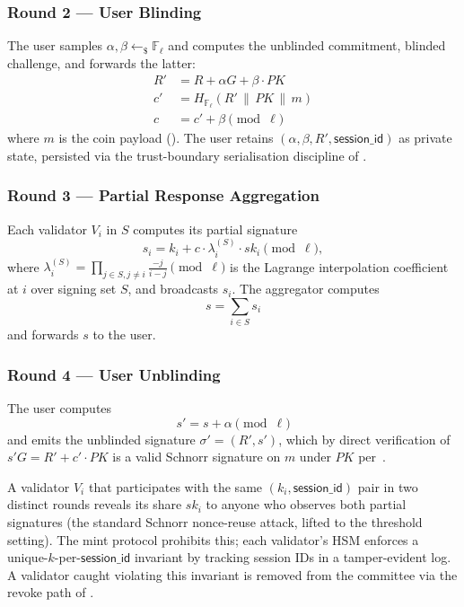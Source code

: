 \subsubsection{Round 2 --- User Blinding}
\label{sec:mint-sign-r2}

The user samples $\alpha, \beta \leftarrow_\$ \mathbb{F}_\ell$ and computes the unblinded commitment, blinded challenge, and forwards the latter:
\begin{align*}
  R' &= R + \alpha G + \beta \cdot PK \\
  c' &= H_{\mathbb{F}_\ell}(R' \,\|\, PK \,\|\, m) \\
  c &= c' + \beta \pmod{\ell}
\end{align*}
where $m$ is the coin payload (). The user retains $(\alpha, \beta, R', \mathsf{session\_id})$ as private state, persisted via the trust-boundary serialisation discipline of .

\subsubsection{Round 3 --- Partial Response Aggregation}
\label{sec:mint-sign-r3}

Each validator $V_i$ in $S$ computes its partial signature
\[
  s_i = k_i + c \cdot \lambda_i^{(S)} \cdot sk_i \pmod{\ell},
\]
where $\lambda_i^{(S)} = \prod_{j \in S, j \neq i} \frac{-j}{i - j} \pmod{\ell}$ is the Lagrange interpolation coefficient at $i$ over signing set $S$, and broadcasts $s_i$. The aggregator computes
\[
  s = \sum_{i \in S} s_i
\]
and forwards $s$ to the user.

\subsubsection{Round 4 --- User Unblinding}
\label{sec:mint-sign-r4}

The user computes
\[
  s' = s + \alpha \pmod{\ell}
\]
and emits the unblinded signature $\sigma' = (R', s')$, which by direct verification of $s' G = R' + c' \cdot PK$ is a valid Schnorr signature on $m$ under $PK$ per~.

\begin{remark}
\label{rem:nonce-reuse}
A validator $V_i$ that participates with the same $(k_i, \mathsf{session\_id})$ pair in two distinct rounds reveals its share $sk_i$ to anyone who observes both partial signatures (the standard Schnorr nonce-reuse attack, lifted to the threshold setting). The mint protocol prohibits this; each validator's HSM enforces a unique-$k$-per-$\mathsf{session\_id}$ invariant by tracking session IDs in a tamper-evident log. A validator caught violating this invariant is removed from the committee via the revoke path of .
\end{remark}

